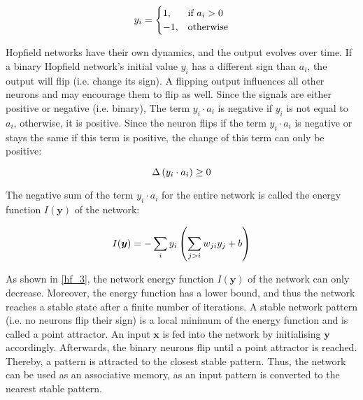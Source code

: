 \begin{equation}\eqlbl{hf_2}
	y_i = \begin{cases}
      		1, & \text{if } a_i > 0 \\
      		-1, & \text{otherwise}
    	\end{cases}
\end{equation}


Hopfield networks have their own dynamics, and the output evolves over time.
If a binary Hopfield network's initial value \(y_i\) has a different sign than $a_i$, the output will flip (i.e. change its sign).
A flipping output influences all other neurons and may encourage them to flip as well.
Since the signals are either positive or negative (i.e. binary), The term \(y_i \cdot a_i\) is negative if \(y_i\) is not equal to \(a_i\), otherwise, it is positive.
Since the neuron flips if the term \(y_i \cdot a_i\) is negative or stays the same if this term is positive, the change of this term can only be positive:

\begin{equation}\eqlbl{hf_3}
	\Delta \left( y_i \cdot a_i \right) \geq 0
\end{equation}

The negative sum of the term $y_i \cdot a_i$ for the entire network is called the energy function $I(\boldsymbol{y})$ of the network:

\begin{equation}\eqlbl{hf_4}
	I(\boldsymbol{y}) = -\sum_{i} y_i \left( \sum_{j>i} w_{ji} y_j + b \right)
\end{equation}

As shown in \eqref{hf_3}, the network energy function \(I(\boldsymbol{y})\) of the network can only decrease.
Moreover, the energy function has a lower bound, and thus the network reaches a stable state after a finite number of iterations. 
A stable network pattern (i.e. no neurons flip their sign) is a local minimum of the energy function and is called a point attractor.
An input $\boldsymbol{x}$ is fed into the network by initialising $\boldsymbol{y}$ accordingly.
Afterwards, the binary neurons flip until a point attractor is reached. Thereby, a pattern is attracted to the closest stable pattern.
Thus, the network can be used as an associative memory, as an input pattern is converted to the nearest stable pattern.

